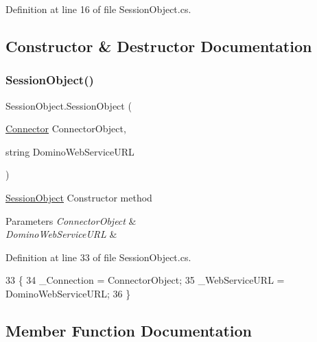 Definition at line 16 of file Session\+Object.\+cs.



\subsection{Constructor \& Destructor Documentation}
\mbox{\label{class_session_object_a173822a7aec467880195d79a1bc9f520}} 
\subsubsection{\texorpdfstring{Session\+Object()}{SessionObject()}}
{\footnotesize\ttfamily Session\+Object.\+Session\+Object (\begin{DoxyParamCaption}\item[{\mbox{\hyperlink{class_connector}{Connector}}}]{Connector\+Object,  }\item[{string}]{Domino\+Web\+Service\+U\+RL }\end{DoxyParamCaption})}



\mbox{\hyperlink{class_session_object}{Session\+Object}} Constructor method 


\begin{DoxyParams}{Parameters}
{\em Connector\+Object} & \\
\hline
{\em Domino\+Web\+Service\+U\+RL} & \\
\hline
\end{DoxyParams}


Definition at line 33 of file Session\+Object.\+cs.


\begin{DoxyCode}
33                                                                                 \{
34         \_Connection = ConnectorObject;
35         \_WebServiceURL = DominoWebServiceURL;
36     \}
\end{DoxyCode}


\subsection{Member Function Documentation}
\mbox{\label{class_session_object_aa4871ea2dac4215bef0274a2bd71ae72}} 
